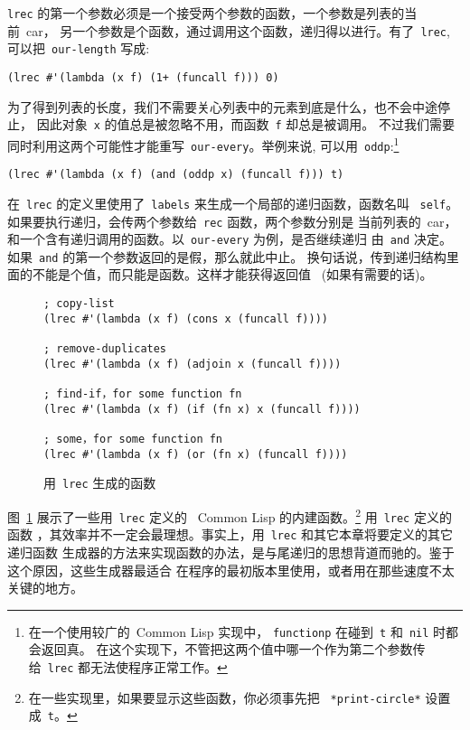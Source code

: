 \texttt{lrec} 的第一个参数必须是一个接受两个参数的函数，一个参数是列表的当前~car，
另一个参数是个函数，通过调用这个函数，递归得以进行。有了~\texttt{lrec},
可以把~\texttt{our-length} 写成:
\begin{lstlisting}
(lrec #'(lambda (x f) (1+ (funcall f))) 0)
\end{lstlisting}
为了得到列表的长度，我们不需要关心列表中的元素到底是什么，也不会中途停止，
因此对象~\texttt{x} 的值总是被忽略不用，而函数~\texttt{f} 却总是被调用。
不过我们需要同时利用这两个可能性才能重写~\texttt{our-every}。举例来说,
可以用~\texttt{oddp}:\footnote{在一个使用较广的~Common Lisp 实现中，
\texttt{functionp} 在碰到~\texttt{t} 和~\texttt{nil} 时都会返回真。
在这个实现下，不管把这两个值中哪一个作为第二个参数传给~\texttt{lrec} 都无法使程序正常工作。}
\begin{lstlisting}
(lrec #'(lambda (x f) (and (oddp x) (funcall f))) t)
\end{lstlisting}

在~\texttt{lrec} 的定义里使用了~\texttt{labels} 来生成一个局部的递归函数，函数名叫
~\texttt{self}。如果要执行递归，会传两个参数给~\texttt{rec} 函数，两个参数分别是
当前列表的~car，和一个含有递归调用的函数。以~\texttt{our-every} 为例，是否继续递归
由~\texttt{and} 决定。如果~\texttt{and} 的第一个参数返回的是假，那么就此中止。
换句话说，传到递归结构里面的不能是个值，而只能是函数。这样才能获得返回值~
(如果有需要的话)。

\begin{figure}
\begin{lstlisting}
; copy-list
(lrec #'(lambda (x f) (cons x (funcall f))))

; remove-duplicates
(lrec #'(lambda (x f) (adjoin x (funcall f))))

; find-if，for some function fn
(lrec #'(lambda (x f) (if (fn x) x (funcall f))))

; some，for some function fn
(lrec #'(lambda (x f) (or (fn x) (funcall f))))
\end{lstlisting}
\caption{\label{fig:functions_expressed_lrec}用~\texttt{lrec} 生成的函数}
\end{figure}

图~\ref{fig:functions_expressed_lrec} 展示了一些用~\texttt{lrec} 定义的
~Common Lisp 的内建函数。\footnote{在一些实现里，如果要显示这些函数，你必须事先把
~\texttt{*print-circle*} 设置成~\texttt{t}。} 用~\texttt{lrec} 定义的函数
，其效率并不一定会最理想。事实上，用~\texttt{lrec} 和其它本章将要定义的其它递归函数%
生成器的方法来实现函数的办法，是与尾递归的思想背道而驰的。鉴于这个原因，这些生成器最适合
在程序的最初版本里使用，或者用在那些速度不太关键的地方。

